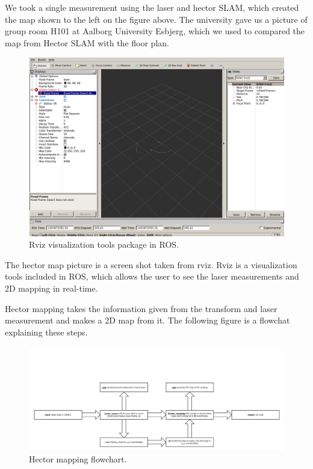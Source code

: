 We took a single measurement using the laser and hector SLAM, which created the map shown to the left on the figure above. The university gave us a picture of group room H101 at Aalborg University Esbjerg, which we used to compared the map from Hector SLAM with the floor plan. 

\begin{figure}[H]
	\centering
	\includegraphics[width=.5\linewidth]{images/rviz.png}
	\caption{Rviz visualization tools package in ROS.}
\end{figure}

The hector map picture is a screen shot taken from rviz. Rviz is a visualization tools included in ROS, which allows the user to see the laser measurements and 2D mapping in real-time.\cite{rviz}



Hector mapping takes the information given from the transform and laser measurement and makes a 2D map from it. The following figure is a flowchat explaining these steps.

\begin{figure}[H]
	\centering
	\includegraphics[width=1\linewidth]{images/hector_flow.png}
	\caption{Hector mapping flowchart.}
\end{figure}
